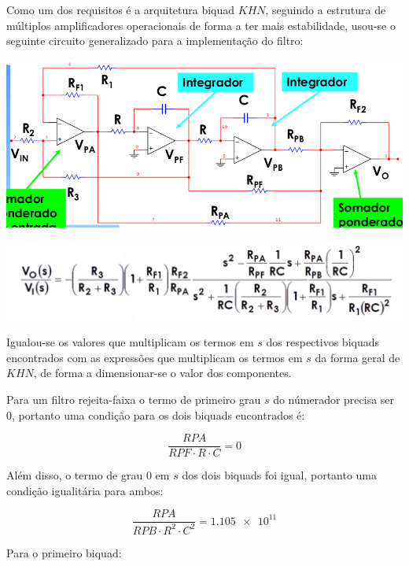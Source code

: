 \documentclass{article}
\begin{document}
Como um dos requisitos é a arquitetura biquad $KHN$, seguindo a estrutura de múltiplos amplificadores operacionais de forma a ter mais estabilidade, usou-se o seguinte circuito generalizado para a implementação do filtro:

\begin{center}
\centering
  \includegraphics[scale=0.5]{img/circuitokhn.png}
\end{center}

\begin{center}
\centering
  \includegraphics[scale=0.5]{img/modelogeral.png}
\end{center}

Igualou-se os valores que multiplicam os termos em $s$ dos respectivos biquads encontrados com as expressões que multiplicam os termos em $s$ da forma geral de $KHN$, de forma a dimensionar-se o valor dos componentes.

Para um filtro rejeita-faixa o termo de primeiro grau $s$ do númerador precisa ser 0, portanto uma condição para os dois biquads encontrados é:

\begin{equation}
    \frac{RPA}{RPF \cdot R \cdot C} = 0
\end{equation}

Além disso, o termo de grau 0 em $s$ dos dois biquads foi igual, portanto uma condição igualitária para ambos:

\begin{equation}
    \frac{RPA}{RPB \cdot R^2 \cdot C^2} = \num{1.105e11}
\end{equation}


Para o primeiro biquad:
\end{document}
